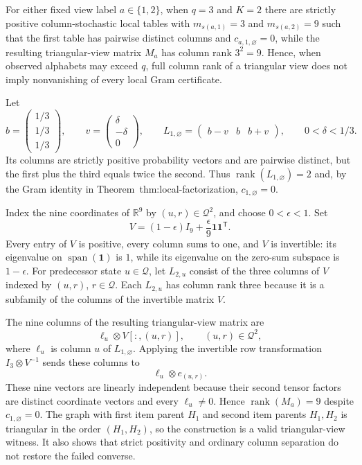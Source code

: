 For either fixed view label \(a\in\{1,2\}\), when \(q=3\) and \(K=2\) there are strictly positive column-stochastic local tables with \(m_{s(a,1)}=3\) and \(m_{s(a,2)}=9\) such that the first table has pairwise distinct columns and \(c_{a,1,\varnothing}=0\), while the resulting triangular-view matrix \(M_a\) has column rank \(3^2=9\).  Hence, when observed alphabets may exceed \(q\), full column rank of a triangular view does not imply nonvanishing of every local Gram certificate.

Let
\[
 b=\begin{pmatrix}1/3\\1/3\\1/3\end{pmatrix},
 \qquad
 v=\begin{pmatrix}\delta\\-\delta\\0\end{pmatrix},
 \qquad
 L_{1,\varnothing}=\begin{pmatrix}b-v&b&b+v\end{pmatrix},
 \qquad 0<\delta<1/3.
\]
Its columns are strictly positive probability vectors and are pairwise distinct, but the first plus the third equals twice the second.  Thus \(\operatorname{rank}(L_{1,\varnothing})=2\) and, by the Gram identity in Theorem~\textnormal{thm:local-factorization}, \(c_{1,\varnothing}=0\).

Index the nine coordinates of \(\mathbb R^9\) by \((u,r)\in\mathcal Q^2\), and choose \(0<\epsilon<1\).  Set
\[
 V=(1-\epsilon)I_9+\frac{\epsilon}{9}\mathbf1\mathbf1^{\mathsf T}.
\]
Every entry of \(V\) is positive, every column sums to one, and \(V\) is invertible: its eigenvalue on \(\operatorname{span}(\mathbf1)\) is \(1\), while its eigenvalue on the zero-sum subspace is \(1-\epsilon\).  For predecessor state \(u\in\mathcal Q\), let \(L_{2,u}\) consist of the three columns of \(V\) indexed by \((u,r)\), \(r\in\mathcal Q\).  Each \(L_{2,u}\) has column rank three because it is a subfamily of the columns of the invertible matrix \(V\).

The nine columns of the resulting triangular-view matrix are
\[
 \ell_u\otimes V[:,(u,r)],
 \qquad (u,r)\in\mathcal Q^2,
\]
where \(\ell_u\) is column \(u\) of \(L_{1,\varnothing}\).  Applying the invertible row transformation \(I_3\otimes V^{-1}\) sends these columns to
\[
 \ell_u\otimes e_{(u,r)}.
\]
These nine vectors are linearly independent because their second tensor factors are distinct coordinate vectors and every \(\ell_u\neq0\).  Hence \(\operatorname{rank}(M_a)=9\) despite \(c_{1,\varnothing}=0\).  The graph with first item parent \(H_1\) and second item parents \(H_1,H_2\) is triangular in the order \((H_1,H_2)\), so the construction is a valid triangular-view witness.  It also shows that strict positivity and ordinary column separation do not restore the failed converse.

